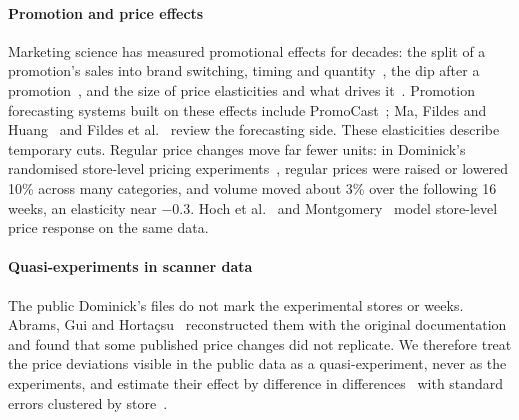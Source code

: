 \paragraph{Promotion and price effects}
Marketing science has measured promotional effects for decades: the split of a
promotion's sales into brand switching, timing and quantity~\cite{gupta1988,
vanheerde2003}, the dip after a promotion~\cite{mace2004,vanheerde2000}, and
the size of price elasticities and what drives it~\cite{bijmolt2005}. Promotion forecasting systems built on these
effects include PromoCast~\cite{promocast}; Ma, Fildes and Huang~\cite{ma2016}
and Fildes et al.~\cite{fildes2022} review the forecasting side. These elasticities describe temporary cuts. Regular price changes move far fewer
units: in Dominick's randomised store-level pricing experiments~\cite{hoch1994},
regular prices were raised or lowered 10\% across many categories, and volume
moved about 3\% over the following 16 weeks, an elasticity near $-0.3$. Hoch et al.~\cite{hoch1995} and
Montgomery~\cite{montgomery1997} model store-level price response on the same
data.

\paragraph{Quasi-experiments in scanner data}
The public Dominick's files do not mark the experimental stores or weeks.
Abrams, Gui and Horta\c{c}su~\cite{abrams} reconstructed them with the
original documentation and found that some published price changes did not
replicate. We therefore treat the price deviations visible in the public data
as a quasi-experiment, never as the experiments, and estimate their effect by
difference in differences~\cite{angrist2009} with standard errors clustered by
store~\cite{bertrand2004,cameron2015}.
